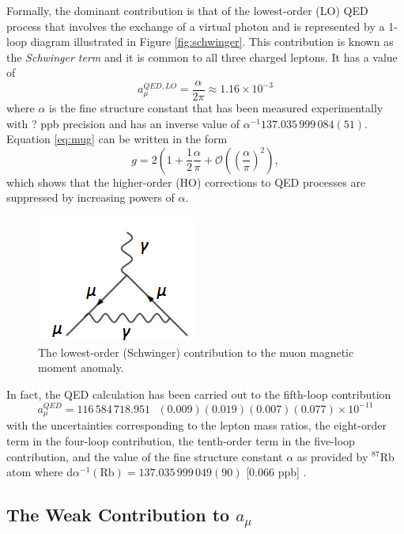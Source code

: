 \documentclass{outhesis}
\begin{document}
Formally, the dominant contribution is that of the lowest-order (LO) QED process that involves the exchange of a virtual photon and is represented by a 1-loop diagram illustrated in Figure \ref{fig:schwinger}. This contribution is known as the \emph{Schwinger term} and it is common to all three charged leptons. It has a value of 
\begin{equation}
a_{\mu}^{QED,LO} = \frac{\alpha}{2\pi} \approx 1.16 \times 10^{-3}
\label{eq:schwinger}
\end{equation}
where $\alpha$ is the fine structure constant that has been measured experimentally with ? ppb precision and has an inverse value of $\alpha^{-1}137.035\,999\,084(51)$.
Equation \ref{eq:mug} can be written in the form
\begin{equation}
g = 2\left(1+\frac{1}{2}\frac{\alpha}{\pi}+ \mathcal{O}\left(\left(\frac{\alpha}{\pi}\right)^2\right),
\label{eq:schwinger}
\end{equation}
which shows that the higher-order (HO) corrections to QED processes are suppressed by increasing powers of $\alpha$.  
\begin{figure}
  \centering
  \includegraphics[scale=0.5]{figures/schwinger}
   \caption{The lowest-order (Schwinger) contribution to the muon magnetic moment anomaly.}
\label{label:schwinger}
\end{figure}

In fact, the QED calculation has been carried out to the fifth-loop contribution
\begin{equation}
a_{\mu}^{QED} = 116\,584\,718.951 \,\,\,\, (0.009)(0.019)(0.007)(0.077) \times 10^{-11}
\end{equation} 
with the uncertainties corresponding to the lepton mass ratios, the eight-order term in the four-loop contribution, the tenth-order term in the five-loop contribution, and the value of the fine structure constant $\alpha$ as provided by $^{87}$Rb atom where d$\alpha^{-1}\left(\text{Rb}\right) = 137.035\,999\,049(90)$ [0.066 ppb] \cite{alpha}.

\subsection{The Weak Contribution to $a_{\mu}$}
\end{document}
